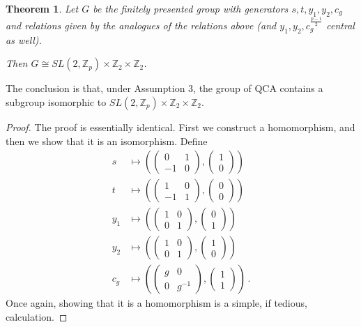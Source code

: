 \documentclass[aps,twocolumn,prx,floatfix,preprintnumbers, nofootinbib,10pt]{revtex4-2}
\numberwithin{equation}{section}
\newtheorem{theorem}{Theorem}[section]
\theoremstyle{definition}
\theoremstyle{remark}
\theoremstyle{claim}
\newcommand{\Z}{{\mathbb Z}}
\newcommand{\paren}[1]{\left( #1 \right)}
\begin{document}
\begin{theorem}\label{thm:SL2pZ2Z2}
 Let $G$ be the finitely presented group with generators $s, t, y_1, y_2, c_g$ and relations given by the analogues of the relations above (and $y_1, y_2, c_g^{\frac{p-1}{2}}$ central as well).
 
 Then $G \cong SL(2, \Z_p) \times \Z_2 \times \Z_2$.
\end{theorem}

The conclusion is that, under Assumption 3, the group of QCA contains a subgroup isomorphic to $SL(2, \Z_p) \times \Z_2 \times \Z_2$.

\begin{proof}
 The proof is essentially identical. First we construct a homomorphism, and then we show that it is an isomorphism. Define
 \begin{align}
  s &\longmapsto \paren{ \begin{pmatrix} 0 & 1 \\ -1 & 0 \end{pmatrix}, \begin{pmatrix} 1 \\ 0 \end{pmatrix} } \nonumber \\
  t &\longmapsto \paren{ \begin{pmatrix} 1 & 0 \\ -1 & 1 \end{pmatrix}, \begin{pmatrix} 0 \\ 0 \end{pmatrix} } \nonumber \\
  y_1 &\longmapsto \paren{ \begin{pmatrix} 1 & 0 \\ 0 & 1 \end{pmatrix}, \begin{pmatrix} 0 \\ 1 \end{pmatrix} } \nonumber \\
  y_2 &\longmapsto \paren{ \begin{pmatrix} 1 & 0 \\ 0 & 1 \end{pmatrix}, \begin{pmatrix} 1 \\ 0 \end{pmatrix} } \nonumber \\
  c_g &\longmapsto \paren{ \begin{pmatrix} g & 0 \\ 0 & g^{-1} \end{pmatrix}, \begin{pmatrix} 1 \\ 1 \end{pmatrix} }\,.
 \end{align}
 Once again, showing that it is a homomorphism is a simple, if tedious, calculation.


\end{proof}
\end{document}
